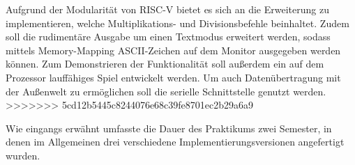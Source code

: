 
Aufgrund der Modularit\"at von RISC-V bietet es sich an die Erweiterung  zu implementieren, welche Multiplikations- und Divisionsbefehle beinhaltet. Zudem soll die rudiment\"are Ausgabe um einen Textmodus erweitert werden, sodass mittels Memory-Mapping ASCII-Zeichen auf dem Monitor ausgegeben werden k\"onnen. Zum Demonstrieren der Funktionalit\"at soll au{\ss}erdem ein auf dem Prozessor lauff\"ahiges Spiel entwickelt werden. Um auch Daten\"ubertragung mit der Au{\ss}enwelt zu erm\"oglichen soll die serielle Schnittstelle genutzt werden.
>>>>>>> 5cd12b5445c8244076e68c39fe8701ec2b29a6a9


Wie eingangs erw\"ahnt umfasste die Dauer des Praktikums zwei Semester, in denen im Allgemeinen drei verschiedene Implementierungsversionen angefertigt wurden.

